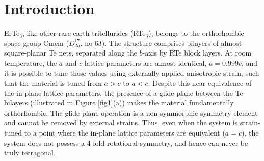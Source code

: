 \documentclass[%
 reprint, %
amsmath,amssymb,
aps,
]{revtex4-2}
\begin{document}
\section{\label{sec:level1}Introduction\protect\\} %

ErTe$_3$, like other rare earth tritellurides (RTe$_3$), belongs to the orthorhombic space group Cmcm ($D^{17}_{2h}$, no 63). The structure comprises bilayers of almost square-planar Te nets, separated along the $b$-axis by RTe block layers. At room temperature, the $a$ and $c$ lattice parameters are almost identical, $a=0.999c$, and it is possible to tune these values using externally applied anisotropic strain, such that the material is tuned from $a>c$ to $a<c$. Despite this near equivalence of the in-plane lattice parameters, the presence of a glide plane between the Te bilayers (illustrated in Figure \ref{fig1}(a)) makes the material fundamentally orthorhombic. The glide plane operation is a non-symmorphic symmetry element and cannot be removed by external strains. Thus, even when the system is strain-tuned to a point where the in-plane lattice parameters are equivalent ($a=c$), the system does not possess a 4-fold rotational symmetry, and hence can never be truly tetragonal. 




\end{document}
